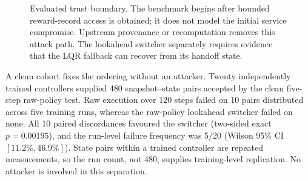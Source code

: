 \begin{figure}[t]
\centering
{}
\caption{Evaluated trust boundary.  The benchmark begins after bounded
reward-record access is obtained; it does not model the initial service
compromise.  Upstream provenance or recomputation removes this attack path.
The lookahead switcher separately requires evidence that the LQR fallback can
recover from its handoff state.}
\label{fig:lifecycle-placeholder}
\end{figure}

A clean cohort fixes the ordering without an attacker.  Twenty independently
trained controllers supplied 480 snapshot--state pairs accepted by the clean
five-step raw-policy test.  Raw execution over 120 steps failed on 10 pairs
distributed across five training runs, whereas the raw-policy lookahead
switcher failed on none.  All 10 paired discordances favoured the switcher
(two-sided exact
$p=0.00195$), and the run-level failure frequency was 5/20 (Wilson 95\% CI
$[11.2\%,46.9\%]$).  State pairs within a trained controller are repeated
measurements, so the run count, not 480, supplies training-level replication.
No attacker is involved in this separation.

